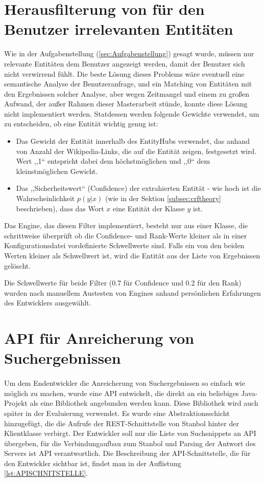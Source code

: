 \section{Herausfilterung von für den Benutzer irrelevanten Entitäten}
Wie in der Aufgabenstellung (\ref{sec:Aufgabenstellung}) gesagt wurde, müssen nur relevante Entitäten dem Benutzer angezeigt werden, damit der Benutzer sich nicht verwirrend fühlt. Die beste Lösung dieses Problems wäre eventuell eine semantische Analyse der Benutzeranfrage, und ein Matching von Entitäten mit den Ergebnissen solcher Analyse, aber wegen Zeitmangel und einem zu großen Aufwand, der außer Rahmen dieser Masterarbeit stünde, konnte diese Lösung nicht implementiert werden. Statdessen werden folgende Gewichte verwendet, um zu entscheiden, ob eine Entität wichtig genug ist:
\begin{itemize}
\item Das Gewicht der Entität innerhalb des EntityHubs verwendet, das anhand von Anzahl der Wikipedia-Links, die auf die Entität zeigen, festgesetzt wird. Wert ,,1`` entspricht dabei dem höchstmöglichen und ,,0`` dem kleinstmöglichen Gewicht.
\item Das ,,Sicherheitswert`` (Confidence) der extrahierten Entität - wie hoch ist die Wahrscheinlichkeit $p(y|x)$ (wie in der Sektion \ref{subsec:crftheory} beschrieben), dass das Wort $x$ eine Entität der Klasse $y$ ist.
\end{itemize}

Das Engine, das diesen Filter implementiert, besteht nur aus einer Klasse, die schrittweise überprüft ob die Confidence- und Rank-Werte kleiner als in einer Konfigurationsdatei vordefinierte Schwellwerte sind. Falls ein von den beiden Werten kleiner als Schwellwert ist, wird die Entität aus der Liste von Ergebnissen gelöscht.

Die Schwellwerte für beide Filter (0.7 für Confidence und 0.2 für den Rank) wurden nach manuellem Austesten von Engines anhand persönlichen Erfahrungen des Entwicklers ausgewählt.

\section{API f{\"{u}}r Anreicherung von Suchergebnissen}
\paragraph{}
Um dem Endentwickler die Anreicherung von Suchergebnissen so einfach wie möglich zu machen, wurde eine API entwickelt, die direkt an ein beliebiges Java-Projekt als eine Bibliothek angebunden werden kann. Diese Bibliothek wird auch später in der Evaluierung verwendet. Es wurde eine Abstraktionsschicht hinzugefügt, die die Aufrufe der REST-Schnittstelle von Stanbol hinter der Klientklasse verbirgt. Der Entwickler soll nur die Liste von Suchsnippets an API übergeben, für die Verbindungaufbau zum Stanbol und Parsing der Antwort des Servers ist API verantwortlich. Die Beschreibung der API-Schnittstelle, die für den Entwickler sichtbar ist, findet man in der Auflistung \ref{lst:APISCHNITSTELLE}. 


